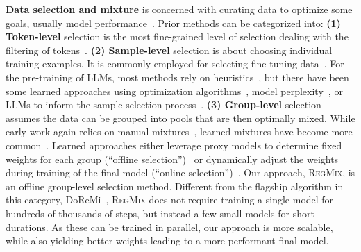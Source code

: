 \documentclass{article}
\theoremstyle{definition}
\theoremstyle{remark}
\newcommand{\ourmethod}{\textsc{RegMix}\xspace}
\begin{document}
\textbf{Data selection and mixture} is concerned with curating data to optimize some goals, usually model performance~\citep{koh2017understanding,albalak2024survey}. Prior methods can be categorized into: \textbf{(1) Token-level} selection is the most fine-grained level of selection dealing with the filtering of tokens~\citep{lin2024rho1}.
\textbf{(2) Sample-level} selection is about choosing individual training examples. It is commonly employed for selecting fine-tuning data~\citep{thakkar2023self, das2023deft,xie2023data,engstrom2024dsdm,xia2024less, liu2023makes, bukharin2023data,kang2024get,mekala2024smaller, sachin2024selectllm,yang2024smalltolarge}. For the pre-training of LLMs, most methods rely on heuristics~\citep{rae2023gopher,sharma2024text,soldaini2024dolma,li2024datacomplmsearchgenerationtraining}, but there have been some learned approaches using optimization algorithms~\citep{chen2024take,mindermann2022prioritized,shao2024balanced,yu2024mates}, model perplexity~\citep{marion2023investigating,muennighoff2023scaling,zachary2024perplexed}, or LLMs to inform the sample selection process~\citep{alex2024qurating,sachdeva2024train,zhang2024autonomous}. \textbf{(3) Group-level} selection assumes the data can be grouped into pools that are then optimally mixed. While early work again relies on manual mixtures~\citep{the_pile_corpus,gpt3paper}, learned mixtures have become more common~\citep{albalak2024survey}. Learned approaches either leverage proxy models to determine fixed weights for each group (``offline selection'')~\citep{rae2023gopher,xie2023doremi,fan2023doge} or dynamically adjust the weights during training of the final model (``online selection'')~\citep{wang2020balancing, chen2023skill,albalak2023efficient}. Our approach, \ourmethod, is an offline group-level selection method. Different from the flagship algorithm in this category, DoReMi~\citep{xie2023doremi}, \ourmethod does not require training a single model for hundreds of thousands of steps, but instead a few small models for short durations. As these can be trained in parallel, our approach is more scalable, while also yielding better weights leading to a more performant final model.
\end{document}
